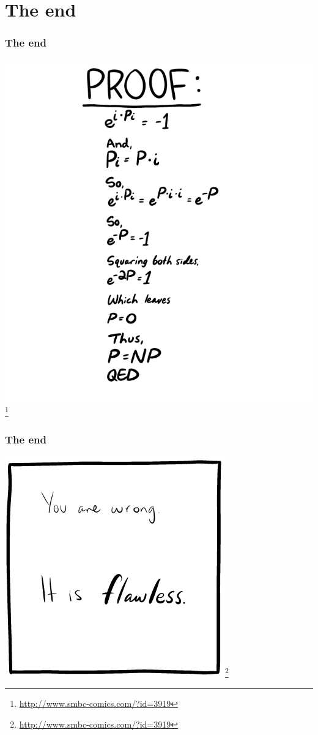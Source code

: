 \documentclass[aspectratio=169]{beamer}
\begin{document}
\section{The end}

\begin{frame}
\begin{center}
\frametitle{The end}
\includegraphics[scale=0.2]{smbc_comic}\footnote{\url{http://www.smbc-comics.com/?id=3919}}
\end{center}
\end{frame}

\begin{frame}
\begin{center}
\frametitle{The end}
\includegraphics[scale=0.5]{smbc_comic_votey}\footnote{\url{http://www.smbc-comics.com/?id=3919}}
\end{center}
\end{frame}
\end{document}

